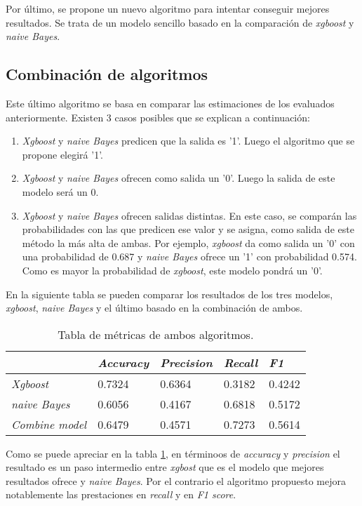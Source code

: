 Por último, se propone un nuevo algoritmo para intentar conseguir mejores resultados. Se trata de un modelo sencillo basado en la comparación de \textit{xgboost} y \textit{naive Bayes}.

\subsection{Combinación de algoritmos}

Este último algoritmo se basa en comparar las estimaciones de los evaluados anteriormente. Existen 3 casos posibles que se explican a continuación:
\begin{enumerate}
	\item \textit{Xgboost} y \textit{naive Bayes} predicen que la salida es '1'. Luego el algoritmo que se propone elegirá '1'.
	\item \textit{Xgboost} y \textit{naive Bayes} ofrecen como salida un '0'. Luego la salida de este modelo será un 0.
	\item \textit{Xgboost} y \textit{naive Bayes} ofrecen salidas distintas. En este caso, se comparán las probabilidades con las que predicen ese valor y se asigna, como salida de este método la más alta de ambas. Por ejemplo, \textit{xgboost} da como salida un '0' con una probabilidad de 0.687 y \textit{naive Bayes} ofrece un '1' con probabilidad 0.574. Como es mayor la probabilidad de \textit{xgboost}, este modelo pondrá un '0'.
\end{enumerate}

En la siguiente tabla se pueden comparar los resultados de los tres modelos, \textit{xgboost}, \textit{naive Bayes} y el último basado en la combinación de ambos.

\begin{table}[htb]
	\begin{center}
		\begin{tabular}{|l|l|l|l|l|}
			\hline
			& \textit{Accuracy} & \textit{Precision} & \textit{Recall} & \textit{F1} \\
			\hline 
			\textit{Xgboost} & 0.7324 & 0.6364 & 0.3182 &  0.4242 \\ \hline
			\textit{naive Bayes} & 0.6056 & 0.4167 & 0.6818 & 0.5172 \\ \hline
			\textit{Combine model} & 0.6479 & 0.4571 & 0.7273 & 0.5614 \\ \hline
		\end{tabular}
		\caption{Tabla de métricas de ambos algoritmos.}
		\label{tabla:results_combine}
	\end{center}
\end{table}

Como se puede apreciar en la tabla \ref{tabla:results_combine}, en términoos de \textit{accuracy} y \textit{precision} el resultado es un paso intermedio entre \textit{xgbost} que es el modelo que mejores resultados ofrece y \textit{naive Bayes}. Por el contrario el algoritmo propuesto mejora notablemente las prestaciones en \textit{recall} y en \textit{F1 score}. 
